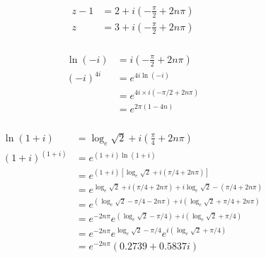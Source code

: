 \documentclass{article}
\begin{document}
\setcounter{subsubsection}{36}
\subsubsection{}

\begin{align*}
  z - 1 & = 2 + i \left( -\frac{\pi}{2} + 2 n \pi \right) \\
  z     & = 3 + i \left( -\frac{\pi}{2} + 2 n \pi \right)
\end{align*}

\setcounter{subsubsection}{38}
\subsubsection{}

\begin{align*}
  \ln (-i)   & = i \left( -\frac{\pi}{2} + 2 n \pi \right) \\
  (-i)^{4 i} & = e^{4 i \ln (-i)}                          \\
             & = e^{4 i \times i (-\pi / 2 + 2 n \pi)}     \\
             & = e^{2 \pi (1 - 4 n)}
\end{align*}

\setcounter{subsubsection}{40}
\subsubsection{}

\begin{align*}
  \ln (1 + i)       & = \log_e \sqrt{2} + i \left( \frac{\pi}{4} + 2 n \pi \right)                            \\
  (1 + i)^{(1 + i)} & = e^{(1 + i) \ln (1 + i)}                                                               \\
                    & = e^{(1 + i) [\log_e \sqrt{2} + i (\pi / 4 + 2 n \pi)]}                                 \\
                    & = e^{\log_e \sqrt{2} + i (\pi / 4 + 2 n \pi) + i \log_e \sqrt{2} - (\pi / 4 + 2 n \pi)} \\
                    & = e^{(\log_e \sqrt{2} - \pi / 4 - 2 n \pi) + i (\log_e \sqrt{2} + \pi / 4 + 2 n \pi)}   \\
                    & = e^{-2 n \pi} e^{(\log_e \sqrt{2} - \pi / 4) + i (\log_e \sqrt{2} + \pi / 4)}          \\
                    & = e^{-2 n \pi} e^{\log_e \sqrt{2} - \pi / 4} e^{i (\log_e \sqrt{2} + \pi / 4)}          \\
                    & = e^{-2 n \pi} (0.2739 + 0.5837 i)
\end{align*}
\end{document}
